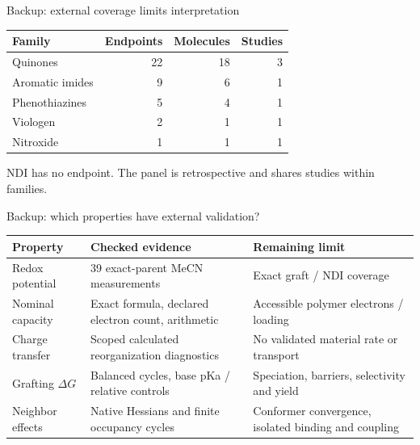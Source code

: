 \begin{frame}{Backup: external coverage limits interpretation}
\centering\renewcommand{\arraystretch}{1.45}
\begin{tabular}{lrrr}\toprule Family & Endpoints & Molecules & Studies\\\midrule
Quinones &22&18&3\\
Aromatic imides &9&6&1\\
Phenothiazines &5&4&1\\
Viologen &2&1&1\\
Nitroxide &1&1&1\\\bottomrule
\end{tabular}
\par\medskip\small NDI has no endpoint. The panel is retrospective and shares studies within families.
\end{frame}

\begin{frame}{Backup: which properties have external validation?}
\small\renewcommand{\arraystretch}{1.4}
\begin{tabular}{@{}lp{5cm}p{4.8cm}@{}}\toprule
Property & Checked evidence & Remaining limit\\\midrule
Redox potential & 39 exact-parent MeCN measurements & Exact graft / NDI coverage\\
Nominal capacity & Exact formula, declared electron count, arithmetic & Accessible polymer electrons / loading\\
Charge transfer & Scoped calculated reorganization diagnostics & No validated material rate or transport\\
Grafting $\Delta G$ & Balanced cycles, base pKa / relative controls & Speciation, barriers, selectivity and yield\\
Neighbor effects & Native Hessians and finite occupancy cycles & Conformer convergence, isolated binding and coupling\\\bottomrule
\end{tabular}
\end{frame}

